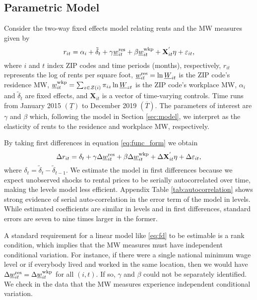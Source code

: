 \subsection{Parametric Model}

Consider the two-way fixed effects model relating rents and the MW measures
given by
\begin{equation} \label{eq:func_form}
    r_{it} = \alpha_i + \tilde{\delta}_t 
           + \gamma \underline{w}^{\text{res}}_{it} + \beta \underline{w}^{\text{wkp}}_{it}
           + \mathbf{X}^{'}_{it}\eta
           + \varepsilon_{it} ,
\end{equation}    
where
$i$ and $t$ index ZIP codes and time periods (months), respectively,
$r_{it}$ represents the log of rents per square foot,
$\underline{w}^{\text{res}}_{it} = \ln \underline{W}_{it}$ is the ZIP code's residence MW,
$\underline{w}^{\text{wkp}}_{it} = \sum_{z\in\mathcal{Z}(i)} \pi_{iz}\ln \underline{W}_{zt}$ is the ZIP code's 
workplace MW,
$\alpha_i$ and $\tilde{\delta}_t$ are fixed effects, and 
$\mathbf{X}_{it}$ is a vector of time-varying controls.
Time runs from January 2015 $\left(\underline{T}\right)$ 
to December 2019 $\left(\overline{T}\right)$.
The parameters of interest are $\gamma$ and $\beta$ which, 
following the model in Section \ref{sec:model}, 
we interpret as the elasticity of rents to the residence and workplace MW, 
respectively.

By taking first differences in equation \eqref{eq:func_form} we obtain
\begin{equation}\label{eq:fd}
    \Delta r_{it} = \delta_t
                  + \gamma \Delta \underline{w}^{\text{res}}_{it} + \beta \Delta \underline{w}^{\text{wkp}}_{it}
                  + \Delta \mathbf{X}^{'}_{it}\eta
                  + \Delta \varepsilon_{it} ,
\end{equation}
where $\delta_t = \tilde{\delta}_t - \tilde{\delta}_{t-1}$.
We estimate the model in first differences because we expect unobserved shocks
to rental prices to be serially autocorrelated over time, making the levels
model less efficient.
Appendix Table \ref{tab:autocorrelation} shows strong evidence of serial 
auto-correlation in the error term of the model in levels.
While estimated coefficients are similar in levels and in first differences, 
standard errors are seven to nine times larger in the former.

A standard requirement for a linear model like \eqref{eq:fd} to be
estimable is a rank condition, which implies that the MW measures must have 
independent conditional variation.
For instance, if there were a single national minimum wage level or if everybody 
lived and worked in the same location, then we would have
$\Delta \underline{w}^{\text{res}}_{it} = \Delta \underline{w}^{\text{wkp}}_{it}$ for all $(i,t)$.
If so, $\gamma$ and $\beta$ could not be separately identified.
We check in the data that the MW measures experience independent conditional 
variation.

